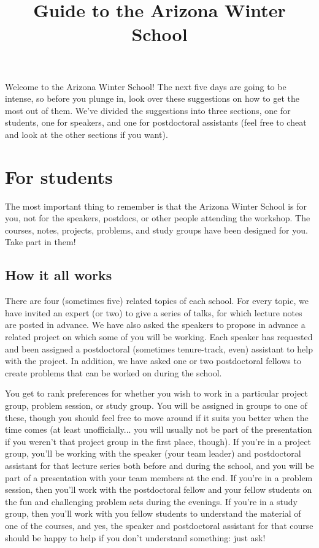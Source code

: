 \documentclass{article}
\title{Guide to the Arizona Winter School}
\date{}
\begin{document}
\maketitle


Welcome to the Arizona Winter School! The next five days are going to
be intense, so before you plunge in, look over these suggestions on
how to get the most out of them. We've divided the suggestions into
three sections, one for students, one for speakers, and one for postdoctoral
assistants (feel free to cheat and look at the other sections if you want).


\section{For students}
\label{sec:students}


The most important thing to remember is that the Arizona Winter School
is for you, not for the speakers, postdocs, or other people attending
the workshop. The courses, notes, projects, problems, and study groups have
been designed for you. Take part in them!


\subsection{How it all works}
\label{sec:how-it-all}

There are four (sometimes five) related topics of each school. 
For every topic, we have invited an expert (or two) to give a series of talks, for which 
lecture notes are posted in advance.  We have also asked the speakers  to
propose in advance a related project on which some of you will be
working.  Each speaker has requested and been assigned a postdoctoral
(sometimes tenure-track, even) assistant to help with the project.  In addition,
we have asked one or two postdoctoral fellows to create problems that can be
worked on during the school.  

You get to rank preferences for whether you 
wish to work in a particular project group, problem session, or study group.
You will be assigned in groups to one of these, though you should feel free to move around
if it suits you better when the time comes (at least unofficially... you will usually
not be part of the presentation if you weren't that project group in the first place, though).  
If you're in a project group, you'll be working with the speaker (your team leader) and
 postdoctoral assistant for that lecture series both before and during the school, and you will be part of 
a presentation with your team members at the end.  If you're in a problem session, then
you'll work with the postdoctoral fellow and your fellow students on the fun and
challenging problem sets during the evenings.  If you're in a study group, then you'll
work with you fellow students to understand the material of one of the courses, and yes,
the speaker and postdoctoral assistant for that course should be happy to help if you
don't understand something: just ask! 
\end{document}
